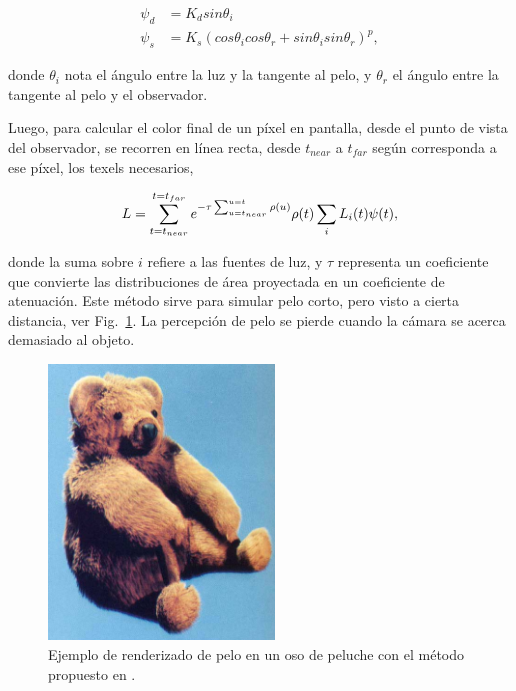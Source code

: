 \begin{align*}
\psi_{d} &= K_{d} sin \theta_{i}\\
\psi_{s} &= K_{s} (cos \theta_{i} cos \theta_{r} + sin \theta_{i} sin \theta_{r})^{p},
\end{align*}

\noindent donde $\theta_{i}$ nota el ángulo entre la luz y la tangente al pelo, y $\theta_{r}$ el ángulo entre la tangente al pelo y el observador.

Luego, para calcular el color final de un píxel en pantalla, desde el punto de vista del observador, se recorren en línea recta, desde $t_{near}$ a $t_{far}$ según corresponda a ese píxel, los texels necesarios,

$$L = \sum_{t=t_{near}}^{t=t_{far}} {e^{-\tau \sum_{u=t_{near}}^{u=t} \rho(u)} \rho(t) \sum_{i} L_{i}(t) \bold{\psi}(t)},$$

\noindent donde la suma sobre $i$ refiere a las fuentes de luz, y $\tau$ representa un coeficiente que convierte las distribuciones de área proyectada en un coeficiente de atenuación.
Este método sirve para simular pelo corto, pero visto a cierta distancia, ver Fig.~\ref{fg:osopelo}.
La percepción de pelo se pierde cuando la cámara se acerca demasiado al objeto.

\begin{figure}
\center
\includegraphics[width=6cm]{figures/osopelo}
\caption[Renderizado de pelo en un oso de peluche]{Ejemplo de renderizado de pelo en un oso de peluche con el método propuesto en \cite{Kajiya1989}.}
\label{fg:osopelo}
\end{figure}


